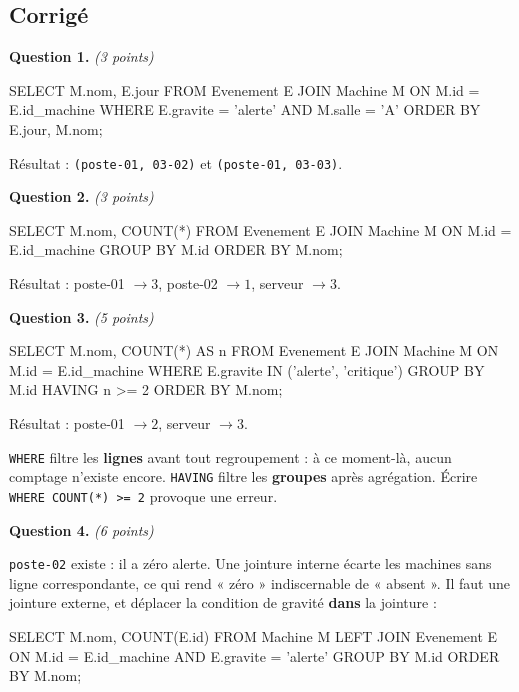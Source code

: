 \subsection*{Corrigé}

\textbf{Question 1.} \emph{(3 points)}

\begin{sql}
SELECT M.nom, E.jour
FROM Evenement E JOIN Machine M ON M.id = E.id_machine
WHERE E.gravite = 'alerte' AND M.salle = 'A'
ORDER BY E.jour, M.nom;
\end{sql}

Résultat : \lstinline{(poste-01, 03-02)} et \lstinline{(poste-01, 03-03)}.

\medskip
\textbf{Question 2.} \emph{(3 points)}

\begin{sql}
SELECT M.nom, COUNT(*)
FROM Evenement E JOIN Machine M ON M.id = E.id_machine
GROUP BY M.id ORDER BY M.nom;
\end{sql}

Résultat : poste-01 $\rightarrow 3$, poste-02 $\rightarrow 1$, serveur
$\rightarrow 3$.

\medskip
\textbf{Question 3.} \emph{(5 points)}

\begin{sql}
SELECT M.nom, COUNT(*) AS n
FROM Evenement E JOIN Machine M ON M.id = E.id_machine
WHERE E.gravite IN ('alerte', 'critique')
GROUP BY M.id HAVING n >= 2 ORDER BY M.nom;
\end{sql}

Résultat : poste-01 $\rightarrow 2$, serveur $\rightarrow 3$.

\lstinline{WHERE} filtre les \textbf{lignes} avant tout regroupement : à ce
moment-là, aucun comptage n'existe encore. \lstinline{HAVING} filtre les
\textbf{groupes} après agrégation. Écrire \lstinline{WHERE COUNT(*) >= 2}
provoque une erreur.

\medskip
\textbf{Question 4.} \emph{(6 points)}

\lstinline{poste-02} existe : il a zéro alerte. Une jointure interne écarte les
machines sans ligne correspondante, ce qui rend « zéro » indiscernable de
« absent ». Il faut une jointure externe, et déplacer la condition de gravité
\textbf{dans} la jointure :

\begin{sql}
SELECT M.nom, COUNT(E.id)
FROM Machine M
LEFT JOIN Evenement E ON M.id = E.id_machine AND E.gravite = 'alerte'
GROUP BY M.id ORDER BY M.nom;
\end{sql}

